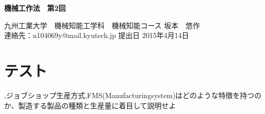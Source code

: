 \documentclass[a4j,twoside,openright,11pt]{jreport}
\begin{document}
\begin{screen}
\huge
\begin{center}
{\bf 機械工作法　第2回}\\
\end{center}

\normalsize
\begin{flushright}
九州工業大学　機械知能工学科　機械知能コース  坂本　悠作\\連絡先：n104069y@mail.kyutech.jp \hspace{0.2in}提出日 2015年4月14日
\end{flushright}
\end{screen}
\section{テスト}
,ジョブショップ生産方式,FMS(Manufacturingsystem)はどのような特徴を持つのか、製造する製品の種類と生産量に着目して説明せよ
\end{document}
